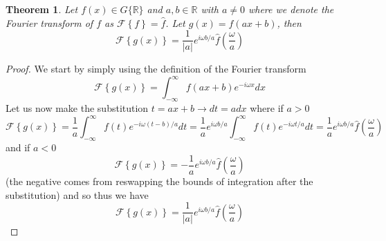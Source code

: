 \documentclass{report}
\newtheorem{theorem}{Theorem}[chapter]
\theoremstyle{definition}
\theoremstyle{remark}
\newcommand{\ft}[1]{\mathscr{F}\left\{ #1\right\}}
\newcommand{\R}{\mathbb{R}}
\begin{document}
\begin{theorem}
    Let $f(x)\in G\{\R\}$ and $a,b \in \R$ with $a\neq 0$ where we denote the Fourier transform of $f$ as $\ft{f}=\hat f$. Let $g(x)=f(ax+b)$, then 
    \begin{equation*}
        \ft{g(x)} = \frac{1}{|a|}e^{i\omega b/a}\hat{f}\left( \frac{\omega}{a}\right)
    \end{equation*}
\end{theorem}
\begin{proof}
    We start by simply using the definition of the Fourier transform 
    \begin{equation*}
        \ft{g(x)} = \int^\infty_{-\infty}f(ax+b)e^{-i\omega x}dx
    \end{equation*}
    Let us now make the substitution $t=ax+b\rightarrow dt=adx$ where if $a>0$
    \begin{equation*}
        \ft{g(x)} = \frac{1}{a}\int^\infty_{-\infty}f(t)e^{-i\omega(t-b)/a}dt = \frac{1}{a}e^{i\omega b/a}\int^\infty_{-\infty}f(t)e^{-i\omega t/a}dt =\frac{1}{a}e^{i\omega b/a}\hat f\left(\frac{\omega}{a}\right)
    \end{equation*}
    and if $a<0$
    \begin{equation*}
        \ft{g(x)} = -\frac{1}{a}e^{i\omega b/a}\hat f\left(\frac{\omega}{a}\right)
    \end{equation*}
    (the negative comes from reswapping the bounds of integration after the substitution) and so thus we have 
    \begin{equation*}
        \ft{g(x)} = \frac{1}{|a|}e^{i\omega b/a}\hat{f}\left( \frac{\omega}{a}\right)
    \end{equation*}
\end{proof}
\end{document}
